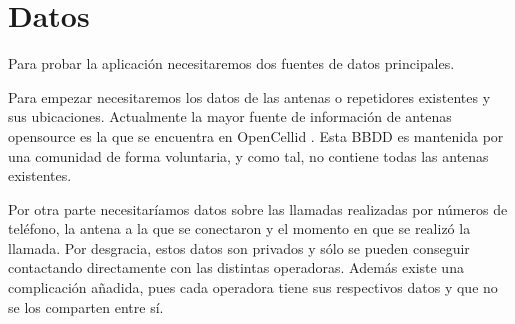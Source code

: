   \section{Datos}
  Para probar la aplicación necesitaremos dos fuentes de datos principales.
  
  Para empezar necesitaremos los datos de las antenas o repetidores existentes y sus ubicaciones. Actualmente la mayor fuente de información de antenas opensource es la que se encuentra en OpenCellid \cite{opencellid}. Esta BBDD es mantenida por una comunidad de forma voluntaria, y como tal, no contiene todas las antenas existentes.
  
  Por otra parte necesitaríamos datos sobre las llamadas realizadas por números de teléfono, la antena a la que se conectaron y el momento en que se realizó la llamada. Por desgracia, estos datos son privados y sólo se pueden conseguir contactando directamente con las distintas operadoras. Además existe una complicación añadida, pues cada operadora tiene sus respectivos datos y que no se los comparten entre sí.